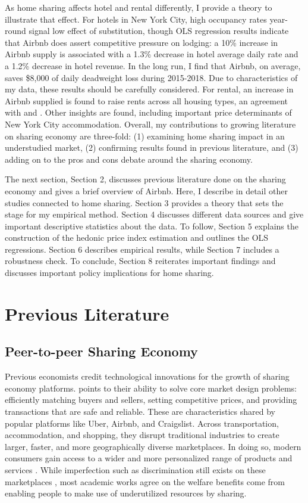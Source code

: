 \documentclass[12pt]{article}
\begin{document}
		\par
		As home sharing affects hotel and rental differently, I provide a theory to illustrate that effect. For hotels in New York City, high occupancy rates year-round signal low effect of substitution, though OLS regression results indicate that Airbnb does  assert competitive pressure on lodging: a 10\% increase in Airbnb supply is associated with a 1.3\% decrease in hotel average daily rate and a 1.2\% decrease in hotel revenue. In the long run, I find that Airbnb, on average, saves \$8,000 of daily deadweight loss during 2015-2018. Due to characteristics of my data, these results should be carefully considered. For rental, an increase in Airbnb supplied is found to raise rents across all housing types, an agreement with \citet{horn2017home} and \cite{barron2018sharing}. Other insights are found, including important price determinants of New York City accommodation. Overall, my contributions to growing literature on sharing economy are three-fold: (1) examining home sharing impact in an understudied market, (2) confirming results found in previous literature, and (3) adding on to the pros and cons debate around the sharing economy.
		
		\par
		The next section, Section 2, discusses previous literature done on the sharing economy and gives a brief overview of Airbnb. Here, I describe in detail other studies connected to home sharing. Section 3 provides a theory that sets the stage for my empirical method. Section 4 discusses different data sources and give important descriptive statistics about the data. To follow, Section 5 explains the construction of the hedonic price index estimation and outlines the OLS regressions. Section 6 describes empirical results, while Section 7 includes a robustness check. To conclude, Section 8 reiterates important findings and discusses important policy implications for home sharing.
		
	\section{Previous Literature} %
		\subsection{Peer-to-peer Sharing Economy}
			Previous economists credit technological innovations for the growth of sharing economy platforms. \citet{einav2016peer} points to their ability to solve core market design problems: efficiently matching buyers and sellers, setting competitive prices, and providing transactions that are safe and reliable. These are characteristics shared by popular platforms like Uber, Airbnb, and Craigslist. Across transportation, accommodation, and shopping, they disrupt traditional industries to create larger, faster, and more geographically diverse marketplaces. In doing so, modern consumers gain access to a wider and more personalized range of products and services \citep{einav2016peer}. While imperfection such as discrimination still exists on these marketplaces \citep{kakar2018visible}, most academic works agree on the welfare benefits come from enabling people to make use of underutilized resources by sharing.
			
\end{document}
